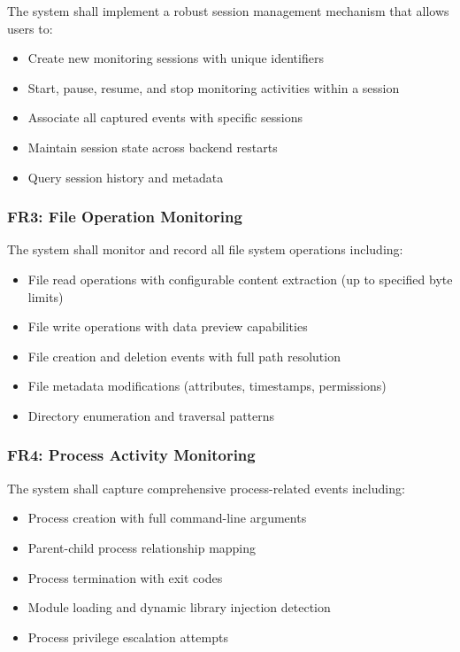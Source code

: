 The system shall implement a robust session management mechanism that allows users to:
\begin{itemize}
    \item Create new monitoring sessions with unique identifiers
    \item Start, pause, resume, and stop monitoring activities within a session
    \item Associate all captured events with specific sessions
    \item Maintain session state across backend restarts
    \item Query session history and metadata
\end{itemize}

\subsubsection{FR3: File Operation Monitoring}

The system shall monitor and record all file system operations including:
\begin{itemize}
    \item File read operations with configurable content extraction (up to specified byte limits)
    \item File write operations with data preview capabilities
    \item File creation and deletion events with full path resolution
    \item File metadata modifications (attributes, timestamps, permissions)
    \item Directory enumeration and traversal patterns
\end{itemize}

\subsubsection{FR4: Process Activity Monitoring}

The system shall capture comprehensive process-related events including:
\begin{itemize}
    \item Process creation with full command-line arguments
    \item Parent-child process relationship mapping
    \item Process termination with exit codes
    \item Module loading and dynamic library injection detection
    \item Process privilege escalation attempts
\end{itemize}


